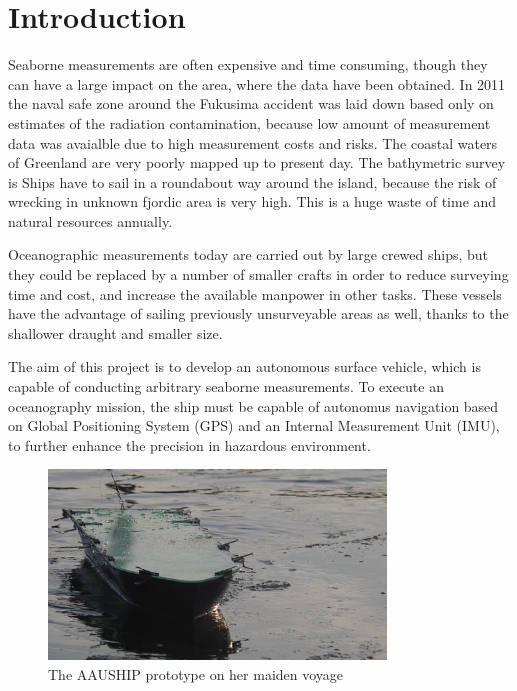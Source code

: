 \section*{Introduction}

Seaborne measurements are often expensive and time consuming, though they can have a large impact on the area, where the data have been obtained. In 2011 the naval safe zone around the Fukusima accident was laid down based only on estimates of the radiation contamination\cite{FNPP}, because low amount of measurement data was avaialble due to high measurement costs and risks. The coastal waters of Greenland are very poorly mapped up to present day\cite{2009AGUFMOS21A1152W}. The bathymetric survey is Ships have to sail in a roundabout way around the island, because the risk of wrecking in unknown fjordic area is very high. This is a huge waste of time and natural resources annually.

Oceanographic measurements today are carried out by large crewed ships, but they could be replaced by a number of smaller crafts in order to reduce surveying time and cost, and increase the available manpower in other tasks. These vessels have the advantage of sailing previously unsurveyable areas as well, thanks to the shallower draught and smaller size.

The aim of this project is to develop an autonomous surface vehicle, which is capable of conducting arbitrary seaborne measurements. To execute an oceanography mission, the ship must be capable of autonomus navigation based on Global Positioning System (GPS) and an Internal Measurement Unit (IMU), to further enhance the precision in hazardous environment.

\begin{figure}[H]
	\centering
	\includegraphics[width=0.8\textwidth]{img/aauship}
	\caption{The AAUSHIP prototype on her maiden voyage}
	\label{fig:aauship}
\end{figure}


